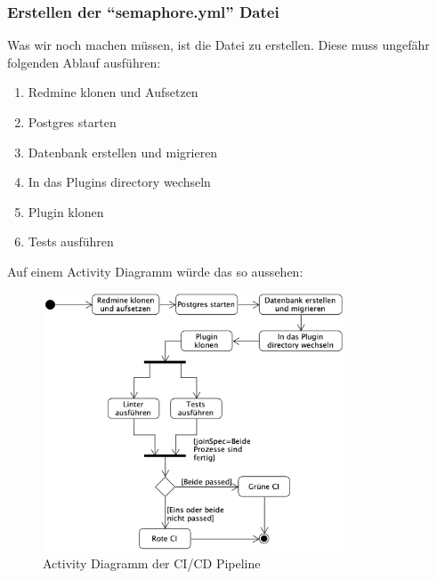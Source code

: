 \subsubsection{Erstellen der \enquote{semaphore.yml} Datei}
Was wir noch machen müssen, ist die  Datei zu erstellen. Diese muss ungefähr folgenden Ablauf
ausführen:
\begin{enumerate}
\item Redmine klonen und Aufsetzen
\item Postgres starten
\item Datenbank erstellen und migrieren
\item In das Plugins directory wechseln
\item Plugin klonen
\item Tests ausführen
\end{enumerate}

Auf einem Activity Diagramm würde das so aussehen:
\begin{figure}[H]
  \centering
  \includegraphics[width=0.8\textwidth]{images/activity/ci-cd.png}
  \caption[Activity Diagramm der CI/CD Pipeline]{Activity Diagramm der CI/CD Pipeline}
  \label{fig:activity_ci_cd}
\end{figure}

